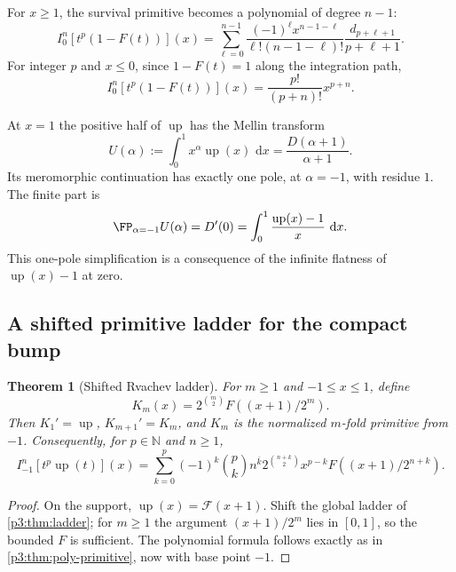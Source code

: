 \documentclass[11pt,oneside]{article}
\newtheorem{theorem}{Theorem}[section]
\theoremstyle{definition}
\theoremstyle{remark}
\newcommand{\Up}{\operatorname{up}}
\newcommand{\N}{\mathbb N}
\newcommand{\dd}{\,\mathrm d}
\newcommand{\rise}[2]{#1^{\overline{#2}}}
\newcommand{\1}{\mathbf 1}
\begin{document}
For $x\ge1$, the survival primitive becomes a polynomial of degree $n-1$:
\begin{equation}
 I_0^n[t^p(1-F(t))](x)
 =\sum_{\ell=0}^{n-1}
 \frac{(-1)^\ell x^{n-1-\ell}}{\ell!(n-1-\ell)!}
 \frac{d_{p+\ell+1}}{p+\ell+1}.                              \label{p3:eq:survival-global-right}
\end{equation}
For integer $p$ and $x\le0$, since $1-F(t)=1$ along the integration path,
\begin{equation}
 I_0^n[t^p(1-F(t))](x)=\frac{p!}{(p+n)!}x^{p+n}.              \label{p3:eq:survival-global-left}
\end{equation}

At $x=1$ the positive half of $\Up$ has the Mellin transform
\begin{equation}
 \boxed{
 U(\alpha):=\int_0^1x^\alpha\Up(x)\,\dd x
 =\frac{D(\alpha+1)}{\alpha+1}.}
 \label{p3:eq:up-Mellin}
\end{equation}
Its meromorphic continuation has exactly one pole, at $\alpha=-1$, with residue $1$.
The finite part is
\begin{equation}
 \FP_{\alpha=-1}U(\alpha)=D'(0)
 =\int_0^1\frac{\Up(x)-1}{x}\,\dd x.                        \label{p3:eq:up-finite-part}
\end{equation}
This one-pole simplification is a consequence of the infinite flatness of $\Up(x)-1$ at
zero.

\subsection{A shifted primitive ladder for the compact bump}

\begin{theorem}[Shifted Rvachev ladder]
\label{p3:thm:up-ladder}
For $m\ge1$ and $-1\le x\le1$, define
\begin{equation}
 K_m(x)=2^{\binom m2}F((x+1)/2^m).                            \label{p3:eq:Km}
\end{equation}
Then $K_1'=\Up$, $K_{m+1}'=K_m$, and $K_m$ is the normalized $m$-fold primitive from $-1$.
Consequently, for $p\in\N$ and $n\ge1$,
\begin{equation}
 \boxed{
 I_{-1}^n[t^p\Up(t)](x)
 =\sum_{k=0}^{p}(-1)^k\binom pk\rise nk
 2^{\binom{n+k}{2}}x^{p-k}F((x+1)/2^{n+k}).}
 \label{p3:eq:up-monomial}
\end{equation}
\end{theorem}

\begin{proof}
On the support, $\Up(x)=\mathcal F(x+1)$.  Shift the global ladder of
\cref{p3:thm:ladder}; for $m\ge1$ the argument $(x+1)/2^m$ lies in $[0,1]$, so the bounded $F$
is sufficient.  The polynomial formula follows exactly as in \cref{p3:thm:poly-primitive}, now
with base point $-1$.
\end{proof}
\end{document}
